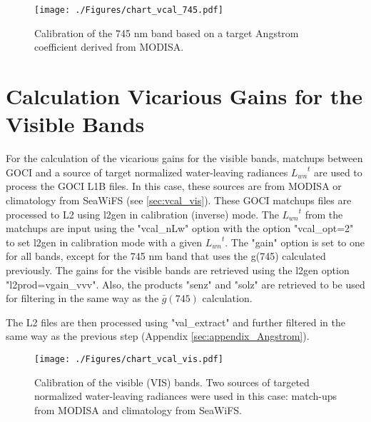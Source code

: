 \documentclass[10pt]{article}
\begin{document}
\begin{figure}[H]
  \centering
  \texttt{[image: ./Figures/chart\_vcal\_745.pdf]}
    \caption{Calibration of the 745 nm band based on a target Angstrom coefficient derived from MODISA.  \label{fig:chart_vcal_745}} 
\end{figure}

\section{Calculation Vicarious Gains for the Visible Bands}\label{sec:appendix_VIS}
For the calculation of the vicarious gains for the visible bands, matchups between GOCI and a source of target normalized water-leaving radiances ${L_{wn}}^t$ are used to process the GOCI L1B files. In this case, these sources are from MODISA or climatology from SeaWiFS (see \autoref{sec:vcal_vis}). These GOCI matchups files are processed to L2 using l2gen in calibration (inverse) mode. The ${L_{wn}}^t$ from the matchups are input using the "vcal\_nLw" option with the option "vcal\_opt=2" to set l2gen in calibration mode with a given ${L_{wn}}^t$. The "gain" option is set to one for all bands, except for the 745 nm band that uses the g(745) calculated previously. The gains for the visible bands are retrieved using the l2gen option "l2prod=vgain\_vvv". Also, the products "senz" and "solz" are retrieved to be used for filtering in the same way as the $\bar{g}(745)$ calculation. 

The L2 files are then processed using "val\_extract" and further filtered in the same way as the previous step (Appendix \ref{sec:appendix_Angstrom}).
\begin{figure}[H]
  \centering
  \texttt{[image: ./Figures/chart\_vcal\_vis.pdf]}
    \caption{Calibration of the visible (VIS) bands. Two sources of targeted normalized water-leaving radiances were used in this case: match-ups from MODISA and climatology from SeaWiFS.  \label{fig:chart_vcal_vis}} 
\end{figure}
\end{document}

